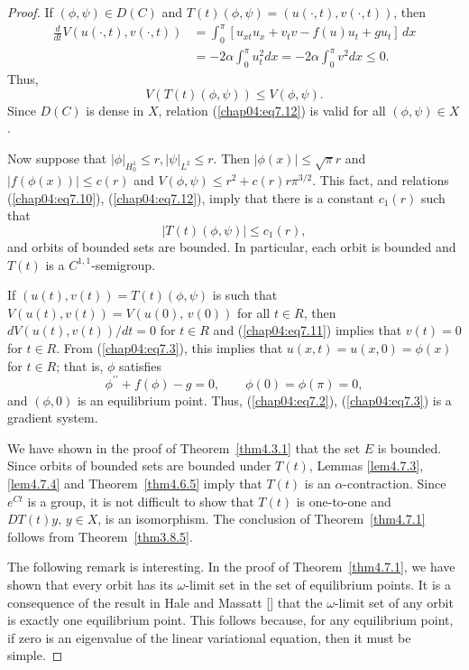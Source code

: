 \documentclass{surv-l}
\theoremstyle{plain}
\theoremstyle{definition}
\numberwithin{equation}{section}
\numberwithin{figure}{chapter}
\begin{document}
\begin{proof}
If $(\phi, \psi)\in D(C)$ and $T(t)(\phi, \psi)=(u(\cdot, t), v(\cdot, t))$, then
\begin{equation}\label{chap04:eq7.11}
\begin{split}
\frac{d}{dt}V(u(\cdot, t), v(\cdot, t))&=\int_{0}^{\pi}[u_{xt}u_{x}+v_{t}v-f(u)u_{t}+gu_{t}]\,dx\\
&=-2\alpha\int_{0}^{\pi}u_{t}^{2}dx=-2\alpha\int_{0}^{\pi}v^{2}dx\leq 0.
\end{split}
\end{equation}
Thus,
\begin{equation}\label{chap04:eq7.12}
V(T(t)(\phi, \psi))\leq V(\phi, \psi).
\end{equation}
Since $D(C)$ is dense in $X$, relation (\ref{chap04:eq7.12}) is valid for all $(\phi, \psi)\in X$.

Now suppose that $|\phi|_{H_{0}^{1}}\leq r, |\psi|_{L^{2}}\leq r$. Then $|\phi(x)|\leq\sqrt{\pi}r$ and $|f(\phi(x))|\leq c(r)$ and $V(\phi, \psi)\leq r^{2}+c(r)r\pi^{3/2}$. This fact, and relations (\ref{chap04:eq7.10}), (\ref{chap04:eq7.12}), imply that there is a constant $c_{1}(r)$ such that
\begin{equation}\label{chap04:eq7.13}
|T(t)(\phi, \psi)|\leq c_{1}(r),
\end{equation}
and orbits of bounded sets are bounded. In particular, each orbit is bounded and $T(t)$ is a $C^{1,1}$-semigroup.

If $(u(t), v(t))=T(t)(\phi, \psi)$ is such that $V(u(t), v(t))=V(u(0),\, v(0))$ for all $t\in R$, then $dV(u(t), v(t))/dt=0$ for $t\in R$ and (\ref{chap04:eq7.11}) implies that $v(t)=0$ for $t\in R$. From (\ref{chap04:eq7.3}), this implies that $u(x, t)=u(x, 0)=\phi(x)$ for $t\in R$; that is, $\phi$ satisfies
\begin{equation}\label{chap04:eq7.14}
\phi^{\prime\prime}+f(\phi)-g=0,\qquad \phi(0)=\phi(\pi)=0,
\end{equation}
and $(\phi, 0)$ is an equilibrium point. Thus, (\ref{chap04:eq7.2}), (\ref{chap04:eq7.3}) is a gradient system.

We have shown in the proof of Theorem~\ref{thm4.3.1} that the set $E$ is bounded. Since orbits of bounded sets are bounded under $T(t)$, Lemmas \ref{lem4.7.3}, \ref{lem4.7.4} and Theorem~\ref{thm4.6.5} imply that $T(t)$ is an $\alpha$-contraction. Since $e^{Ct}$ is a group, it is not difficult to show that $T(t)$ is one-to-one and $DT(t)y,\, y\in X$, is an isomorphism. The conclusion of Theorem~\ref{thm4.7.1} follows from Theorem~\ref{thm3.8.5}.

The following remark is interesting. In the proof of Theorem~\ref{thm4.7.1}, we have shown that every orbit has its $\omega$-limit set in the set of equilibrium points. It is a consequence of the result in Hale and Massatt [\citeyear{1982hm}] that the $\omega$-limit set of any orbit is exactly one equilibrium point. This follows because, for any equilibrium point, if zero is an eigenvalue of the linear variational equation, then it must be simple.
\end{proof}
\end{document}
